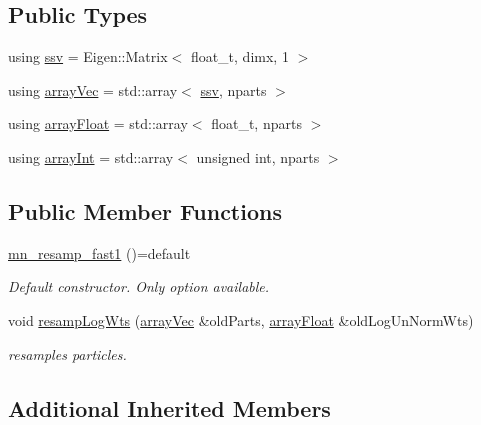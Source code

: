 \subsection*{Public Types}
\begin{DoxyCompactItemize}
\item 
using \hyperlink{classmn__resamp__fast1_a262ade482db1a5205579fb30dd39335a}{ssv} = Eigen\+::\+Matrix$<$ float\+\_\+t, dimx, 1 $>$
\item 
using \hyperlink{classmn__resamp__fast1_af55a3279b6b865cb2656ea4e7e832136}{array\+Vec} = std\+::array$<$ \hyperlink{classrbase_ae20e0b8df15aa109252f57ecbf1f20f8}{ssv}, nparts $>$
\item 
using \hyperlink{classmn__resamp__fast1_a9c95e7078cc9709024031bac44b431d6}{array\+Float} = std\+::array$<$ float\+\_\+t, nparts $>$
\item 
using \hyperlink{classmn__resamp__fast1_a8bf919fd596ab39fccbe152f5a742022}{array\+Int} = std\+::array$<$ unsigned int, nparts $>$
\end{DoxyCompactItemize}
\subsection*{Public Member Functions}
\begin{DoxyCompactItemize}
\item 
\mbox{\label{classmn__resamp__fast1_ac59dde1e16dc40fc173e81edd4b5c3b9}} 
\hyperlink{classmn__resamp__fast1_ac59dde1e16dc40fc173e81edd4b5c3b9}{mn\+\_\+resamp\+\_\+fast1} ()=default
\begin{DoxyCompactList}\small\item\em Default constructor. Only option available. \end{DoxyCompactList}\item 
void \hyperlink{classmn__resamp__fast1_a398e64faa29bafd345c0258ca90d489c}{resamp\+Log\+Wts} (\hyperlink{classrbase_aa12fc826befa6ba0647b5f59ebc396ee}{array\+Vec} \&old\+Parts, \hyperlink{classrbase_a6f76bef853e508cb5b6f546d231b06f5}{array\+Float} \&old\+Log\+Un\+Norm\+Wts)
\begin{DoxyCompactList}\small\item\em resamples particles. \end{DoxyCompactList}\end{DoxyCompactItemize}
\subsection*{Additional Inherited Members}


